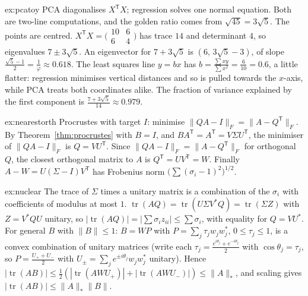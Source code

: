 \begin{solution}{ex:pcatoy}
\idea PCA diagonalises $X^{\mathsf T}X$; regression solves one normal equation. Both are two-line computations, and the
golden ratio comes from $\sqrt{45}=3\sqrt5$.
\writeup The points are centred. $X^{\mathsf T}X=\bigl(\begin{smallmatrix}10&6\\6&4\end{smallmatrix}\bigr)$ has trace $14$ and
determinant $4$, so eigenvalues $7\pm3\sqrt5$. An eigenvector for $7+3\sqrt5$ is $(6,\,3\sqrt5-3)$, of slope $\frac{\sqrt5-1}2=
\frac1\varphi\approx0.618$. The least squares line $y=bx$ has $b=\frac{\sum xy}{\sum x^2}=\frac6{10}=0.6$, a little flatter:
regression minimises vertical distances and so is pulled towards the $x$-axis, while PCA treats both coordinates alike. The
fraction of variance explained by the first component is $\frac{7+3\sqrt5}{14}\approx0.979$.
\end{solution}

\begin{solution}{ex:nearestorth}
\idea Procrustes with target $I$: minimise $\|QA-I\|_F=\|A-Q^{\mathsf T}\|_F$.
\writeup By Theorem~\ref{thm:procrustes} with $B=I$, and $BA^{\mathsf T}=A^{\mathsf T}=V\Sigma U^{\mathsf T}$, the minimiser of
$\|QA-I\|_F$ is $Q=VU^{\mathsf T}$. Since $\|QA-I\|_F=\|A-Q^{\mathsf T}\|_F$ for orthogonal $Q$, the closest orthogonal matrix to
$A$ is $Q^{\mathsf T}=UV^{\mathsf T}=W$. Finally $A-W=U(\Sigma-I)V^{\mathsf T}$ has Frobenius norm $\bigl(\sum(\sigma_i-1)^2\bigr)^{1/2}$.
\end{solution}

\begin{solution}{ex:nuclear}
\idea The trace of $\Sigma$ times a unitary matrix is a combination of the $\sigma_i$ with coefficients of modulus at most $1$.
\writeup $\operatorname{tr}(AQ)=\operatorname{tr}(U\Sigma V^*Q)=\operatorname{tr}(\Sigma Z)$ with $Z=V^*QU$ unitary, so
$|\operatorname{tr}(AQ)|=|\sum\sigma_iz_{ii}|\le\sum\sigma_i$, with equality for $Q=VU^*$. For general $B$ with $\|B\|\le1$:
$B=W P$ with $P=\sum_j\tau_jw_jw_j^*$, $0\le\tau_j\le1$, is a convex combination of unitary matrices (write each $\tau_j=
\frac{e^{i\theta_j}+e^{-i\theta_j}}2$ with $\cos\theta_j=\tau_j$, so $P=\frac{U_++U_-}2$ with $U_\pm=\sum_je^{\pm i\theta_j}w_jw_j^*$
unitary). Hence $|\operatorname{tr}(AB)|\le\frac12(|\operatorname{tr}(AWU_+)|+|\operatorname{tr}(AWU_-)|)\le\|A\|_*$, and scaling
gives $|\operatorname{tr}(AB)|\le\|A\|_*\|B\|$.
\end{solution}

